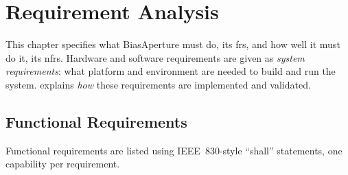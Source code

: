 \chapter{Requirement Analysis}
\label{chap:requirements}

This chapter specifies what BiasAperture must do, its \glspl{fr}, and how well it must do it, its \glspl{nfr}. Hardware and software requirements are given as \emph{system requirements}: what platform and environment are needed to build and run the system.  explains \emph{how} these requirements are implemented and validated.

\section{Functional Requirements}

Functional requirements are listed using IEEE~830-style ``shall'' statements, one capability per requirement.

